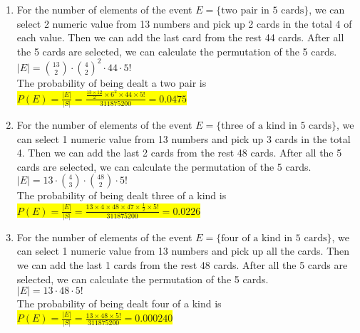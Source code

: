 \documentclass{article}
\begin{document}
\begin{enumerate}
\begin{enumerate}
		\item
		\mysolu
		For the number of elements of the event ${E=\{\text{two pair in 5 cards}\}}$, we can select 2 numeric value from 13 numbers and pick up 2 cards in the total 4 of each value. Then we can add the last card from the rest 44 cards. After all the 5 cards are selected, we can calculate the permutation of the 5 cards.\\
		${|E|={13 \choose 2}\cdot{4 \choose 2}^2 \cdot44\cdot 5!}$\\
		\myansw
		The probability of being dealt a two pair is\\
		\colorbox{yellow}{
			${P(E)=\frac{|E|}{|S|}=\frac{\frac{13\times12}{2}\times6^2\times44\times 5!}{311875200}=0.0475}$
		}\\
	
		\item
		\mysolu
		For the number of elements of the event ${E=\{\text{three of a kind in 5 cards}\}}$, we can select 1 numeric value from 13 numbers and pick up 3 cards in the total 4. Then we can add the last 2 cards from the rest 48 cards. After all the 5 cards are selected, we can calculate the permutation of the 5 cards.\\
		${|E|=13\cdot{4 \choose 3} \cdot{48 \choose 2}\cdot 5!}$\\
		\myansw
		The probability of being dealt three of a kind is\\
		\colorbox{yellow}{
			${P(E)=\frac{|E|}{|S|}=\frac{13\times4\times48\times47\times \frac{1}{2} \times 5!}{311875200}=0.0226}$
		}\\
		
		\item
		\mysolu
		For the number of elements of the event ${E=\{\text{four of a kind in 5 cards}\}}$, we can select 1 numeric value from 13 numbers and pick up all the cards. Then we can add the last 1 cards from the rest 48 cards. After all the 5 cards are selected, we can calculate the permutation of the 5 cards.\\
		${|E|=13\cdot 48\cdot 5!}$\\
		\myansw
		The probability of being dealt four of a kind is\\
		\colorbox{yellow}{
			${P(E)=\frac{|E|}{|S|}=\frac{13\times48 \times 5!}{311875200}=0.000240}$
		}\\		
		


\end{enumerate}
\end{enumerate}
\end{document}

